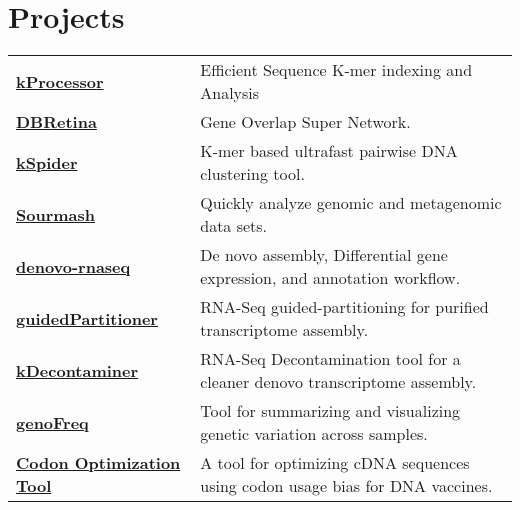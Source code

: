 \section{Projects}
\noindent
\begin{tabular}{@{}p{} p{}}
  \textbf{\href{https://github.com/dib-lab/kProcessor}{kProcessor}} & Efficient Sequence K-mer indexing and Analysis \\
  \textbf{\href{https://dbretina.github.io/DBRetina/}{DBRetina}} & Gene Overlap Super Network. \\
  \textbf{\href{https://github.com/dib-lab/kSpider}{kSpider}} & K-mer based ultrafast pairwise DNA clustering tool. \\
  \textbf{\href{https://github.com/sourmash-bio/sourmash}{Sourmash}}  & Quickly analyze genomic and metagenomic data sets. \\
  \textbf{\href{https://github.com/mr-eyes/denovo-rnaseq}{denovo-rnaseq}} & De novo assembly, Differential gene expression, and annotation workflow. \\
  \textbf{\href{https://github.com/mr-eyes/guidedPartitioner}{guidedPartitioner}} & RNA-Seq guided-partitioning for purified transcriptome assembly. \\
  \textbf{\href{https://github.com/mr-eyes/kDecontaminer}{kDecontaminer}} & RNA-Seq Decontamination tool for a cleaner denovo transcriptome assembly. \\
  \textbf{\href{https://github.com/mr-eyes/genoFreq/}{genoFreq}} & Tool for summarizing and visualizing genetic variation across samples. \\
  \textbf{\href{https://github.com/mr-eyes/codons-optimizer}{Codon Optimization Tool}} & A tool for optimizing cDNA sequences using codon usage bias for DNA vaccines. \\
\end{tabular}
